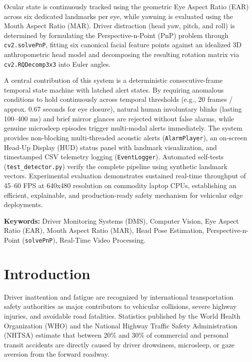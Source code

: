 \documentclass[11pt,a4paper]{article}
\begin{document}
Ocular state is continuously tracked using the geometric Eye Aspect Ratio (EAR) across six dedicated landmarks per eye, while yawning is evaluated using the Mouth Aspect Ratio (MAR). Driver distraction (head yaw, pitch, and roll) is determined by formulating the Perspective-n-Point (PnP) problem through \texttt{cv2.solvePnP}, fitting six canonical facial feature points against an idealized 3D anthropometric head model and decomposing the resulting rotation matrix via \texttt{cv2.RQDecomp3x3} into Euler angles. 

A central contribution of this system is a deterministic consecutive-frame temporal state machine with latched alert states. By requiring anomalous conditions to hold continuously across temporal thresholds (e.g., 20 frames / approx. 0.67 seconds for eye closure), natural human involuntary blinks (lasting 100--400 ms) and brief mirror glances are rejected without false alarms, while genuine microsleep episodes trigger multi-modal alerts immediately. The system provides non-blocking multi-threaded acoustic alerts (\texttt{AlarmPlayer}), an on-screen Head-Up Display (HUD) status panel with landmark visualization, and timestamped CSV telemetry logging (\texttt{EventLogger}). Automated self-tests (\texttt{test\_detector.py}) verify the complete pipeline using synthetic landmark vectors. Experimental evaluation demonstrates sustained real-time throughput of 45--60 FPS at 640x480 resolution on commodity laptop CPUs, establishing an efficient, explainable, and production-ready safety mechanism for vehicular edge deployments.

\vspace{0.5cm}
\noindent\textbf{Keywords:} Driver Monitoring Systems (DMS), Computer Vision, Eye Aspect Ratio (EAR), Mouth Aspect Ratio (MAR), Head Pose Estimation, Perspective-n-Point (\texttt{solvePnP}), Real-Time Video Processing.

\newpage
\section{Introduction}
Driver inattention and fatigue are recognized by international transportation safety authorities as major contributors to vehicular collisions, severe highway injuries, and avoidable road fatalities. Statistics published by the World Health Organization (WHO) and the National Highway Traffic Safety Administration (NHTSA) estimate that between 20\% and 30\% of commercial and personal transit accidents are directly caused by driver drowsiness, microsleep, or gaze aversion from the forward roadway.
\end{document}
